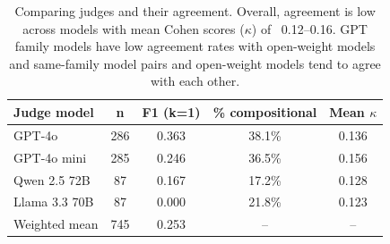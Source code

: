 \documentclass[11pt]{article}
\begin{document}
      \begin{table}[h]
  \centering\small
  \begin{tabular}{lcccc}
  \toprule
  \textbf{Judge model} & \textbf{n} & \textbf{F1 (k=1)} & \textbf{\% compositional} & \textbf{Mean $\kappa$} \\
  \midrule
  GPT-4o         & 286 & 0.363 & 38.1\% & 0.136 \\
  GPT-4o mini    & 285 & 0.246 & 36.5\% & 0.156 \\
  Qwen 2.5 72B   &  87 & 0.167 & 17.2\% & 0.128 \\
  Llama 3.3 70B  &  87 & 0.000 & 21.8\% & 0.123 \\
  \midrule
  Weighted mean  & 745 & 0.253 & --     & --     \\
  \bottomrule
  \end{tabular}
  \caption{Comparing judges and their agreement. Overall, agreement is low across models with mean Cohen scores ($\kappa$) of ~0.12–0.16. GPT
  family models have low agreement rates with open-weight models and same-family model pairs and open-weight models tend to agree with each
  other.}
  \label{tab:divergence_by_model}
  \end{table}
\end{document}
